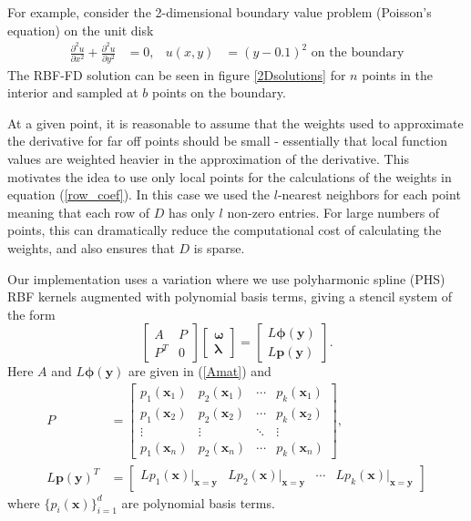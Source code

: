 \documentclass[12pt]{article}
\let\vec\mathbf
\begin{document}
For example, consider the 2-dimensional boundary value problem (Poisson's equation) on the unit disk
\begin{align}
\frac{\partial ^2u}{\partial x^2} + \frac{\partial ^2u}{\partial y^2} &= 0, & u(x,y)&=(y-0.1)^2 \text{ on the boundary}  \label{PDE2D}
\end{align}
The RBF-FD solution can be seen in figure \ref{2Dsolutions} for $n$ points in the interior and sampled at $b$ points on the boundary.

At a given point, it is reasonable to assume that the weights used to approximate the derivative for far off points should be small - essentially that local function values are weighted heavier in the approximation of the derivative. This motivates the idea to use only local points for the calculations of the weights in equation (\ref{row_coef}). In this case we used the $l$-nearest neighbors for each point meaning that each row of $D$ has only $l$ non-zero entries. For large numbers of points, this can dramatically reduce the computational cost of calculating the weights, and also ensures that $D$ is sparse. 

Our implementation uses a variation where we use polyharmonic spline (PHS) RBF kernels augmented with polynomial basis terms, giving a stencil system of the form
$$
\begin{bmatrix}
	A &P\\
	P^T &0
\end{bmatrix}
\begin{bmatrix}
	\vec{\omega}\\
	\vec{\lambda}
\end{bmatrix}
=
\begin{bmatrix}
	L\vec{\phi}(\vec{y}) \\
	L\vec{p}(\vec{y}) 
\end{bmatrix}.
$$
Here $A$ and $L\vec{\phi}(\vec{y})$ are given in (\ref{Amat}) and
\begin{align*}
	P&=
	\begin{bmatrix}
		p_1(\vec{x}_1)  &p_2(\vec{x}_1)  &\cdots  &p_k(\vec{x}_1) \\
		p_1(\vec{x}_2)  &p_2(\vec{x}_2)  &\cdots &p_k(\vec{x}_2) \\
		\vdots  &\vdots  &\ddots &\vdots\\
		p_1(\vec{x}_n)  &p_2(\vec{x}_n)  &\cdots &p_k(\vec{x}_n)
	\end{bmatrix},\\
	L\vec{p}(\vec{y}) ^T&=\begin{bmatrix}
		L p_1(\vec{x})\vert_{\vec{x}=\vec{y}}  &L p_2(\vec{x})\vert_{\vec{x}=\vec{y}} &\cdots &L p_k(\vec{x})\vert_{\vec{x}=\vec{y}} 
	\end{bmatrix}
\end{align*}
where $\{p_i(\vec{x})\}_{i=1}^d$ are polynomial basis terms.
\end{document}
